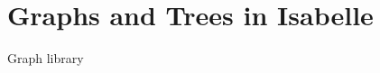 \chapter{Graphs and Trees in Isabelle}\label{chapter:isabelle_graphs}

Graph library \cite{Undirected_Graph_Theory-AFP}
